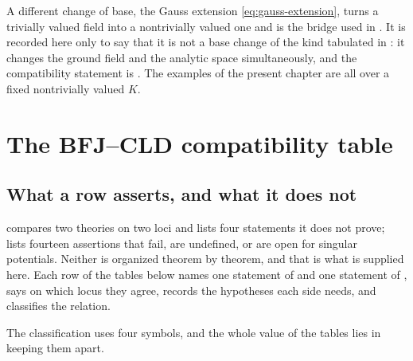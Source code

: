 \begin{remark}
\label{rem:ch31-gauss}
A different change of base, the Gauss extension \eqref{eq:gauss-extension},
turns a trivially valued field into a nontrivially valued one and is the
bridge used in .  It is recorded here only to say that it is
not a base change of the kind tabulated in : it
changes the ground field and the analytic space simultaneously, and the
compatibility statement is .  The
examples of the present chapter are all over a fixed nontrivially valued
\(K\).
\end{remark}

\section{The BFJ--CLD compatibility table}
\label{sec:ch31-table}

\subsection{What a row asserts, and what it does not}
\label{sec:ch31-table-reading}

 compares two theories on two loci and
lists four statements it does not prove;
 lists fourteen assertions that fail, are
undefined, or are open for singular potentials.  Neither is organized
theorem by theorem, and that is what is supplied here.  Each row of the
tables below names one statement of  and one statement of
, says on which locus they agree, records the hypotheses each
side needs, and classifies the relation.

The classification uses four symbols, and the whole value of the tables lies
in keeping them apart.

